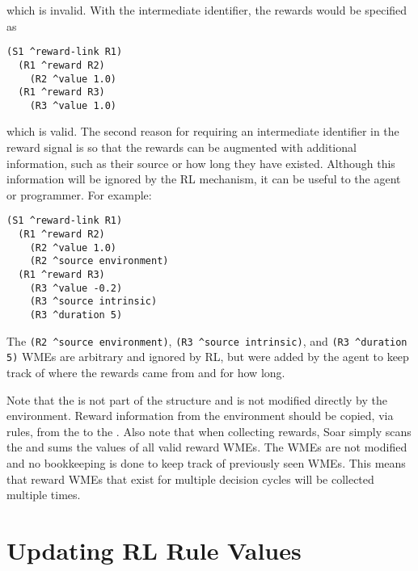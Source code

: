 which is invalid. With the intermediate identifier, the rewards would be specified as

\begin{verbatim}
(S1 ^reward-link R1)
  (R1 ^reward R2)
    (R2 ^value 1.0)
  (R1 ^reward R3)
    (R3 ^value 1.0)
\end{verbatim}

which is valid.
The second reason for requiring an intermediate identifier in the reward signal is so that the rewards can be augmented with additional information, such as their source or how long they have existed.
Although this information will be ignored by the RL mechanism, it can be useful to the agent or programmer.
For example:

\begin{verbatim}
(S1 ^reward-link R1)
  (R1 ^reward R2)
    (R2 ^value 1.0)
    (R2 ^source environment)
  (R1 ^reward R3)
    (R3 ^value -0.2)
    (R3 ^source intrinsic)
    (R3 ^duration 5)
\end{verbatim}  

The \verb=(R2 ^source environment)=, \verb=(R3 ^source intrinsic)=, and \verb=(R3 ^duration 5)= WMEs are arbitrary and ignored by RL, but were added by the agent to keep track of where the rewards came from and for how long.

Note that the  is not part of the  structure and is not modified directly by the environment.
Reward information from the environment should be copied, via rules, from the  to the .
Also note that when collecting rewards, Soar simply scans the  and sums the values of all valid reward WMEs.
The WMEs are not modified and no bookkeeping is done to keep track of previously seen WMEs.
This means that reward WMEs that exist for multiple decision cycles will be collected multiple times.

\section{Updating RL Rule Values}
\label{RL-algo}

